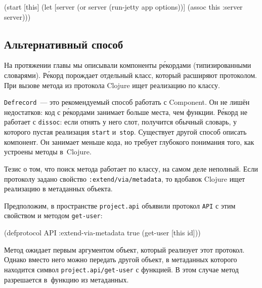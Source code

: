 \else

\begin{english}
  \begin{clojure}
(start [this]
  (let [server (or server
                   (run-jetty app options))]
    (assoc this :server server)))
  \end{clojure}
\end{english}

\fi

\subsection{Альтернативный способ}

На протяжении главы мы описывали компоненты р\'{е}кордами (типизированными
словарями). Р\'{е}корд порождает отдельный класс, который расширяют
протоколом. При вызове метода из протокола Clojure ищет реализацию по классу.


\verb|Defrecord|~--- это рекомендуемый способ работать с Component. Он не лишён
недостатков: код с р\'{е}кордами занимает больше места, чем функции. Р\'{е}корд
не работает с \verb|dissoc|: если отнять у него слот, получится обычный словарь,
у которого пустая реализация \verb|start| и~\verb|stop|. Существует другой
способ описать компонент. Он занимает меньше кода, но требует глубокого
понимания того, как устроены методы в~Clojure.

Тезис о том, что поиск метода работает по классу, на самом деле неполный. Если
протоколу задано свойство \texttt{:extend\-/via\-/metadata}, то вдобавок Clojure ищет
реализацию в метаданных объекта.

Предположим, в пространстве \verb|project.api| объявили протокол \verb|API| с
этим свойством и методом \verb|get-user|:

\begin{english}
  \begin{clojure}
(defprotocol API
  :extend-via-metadata true
  (get-user [this id]))
  \end{clojure}
\end{english}

Метод ожидает первым аргументом объект, который реализует этот протокол. Однако
вместо него можно передать другой объект, в метаданных которого находится символ
\verb|project.api/get-user| с функцией. В этом случае метод разрешается
в~функцию из метаданных.

\begin{english}
\end{english}

